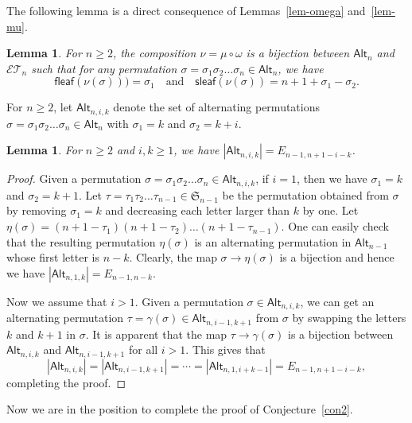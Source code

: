 \documentclass[12pt]{article}
\numberwithin{equation}{section}
\theoremstyle{plain}
\newtheorem{lemma}[theorem]{Lemma}
\def\Alt{\mathsf{Alt}}
\def\fleaf{\mathsf{fleaf}}
\def\sleaf{\mathsf{sleaf}}
\begin{document}
  
  The following lemma is a direct consequence of Lemmas~\ref{lem-omega} and~\ref{lem-mu}. 
  \begin{lemma}\label{lem-comp}
  	For $n\geq 2$, the composition  $\nu=\mu\circ\omega$ is a bijection between $\Alt_n$ and $\mathcal{ET}_n$ such that for any  permutation $\sigma=\sigma_1\sigma_2\ldots \sigma_n\in \Alt_n$, we have
  	\begin{equation}\label{eq-comp}
  		\fleaf(\nu(\sigma)))= \sigma_1 \quad \text{and}\quad \sleaf(\nu(\sigma))=n+1+\sigma_1-\sigma_2.
  	\end{equation}
  \end{lemma}
  
  For $n\geq 2$, 
  let $\Alt_{n, i,k}$ denote the set of alternating permutations $\sigma=\sigma_1\sigma_2\ldots \sigma_n\in \Alt_n$ with $\sigma_1=k$ and $\sigma_2=k+i$.
  
  \begin{lemma}\label{lem-Alt}
  	For $n\geq 2$ and $i, k\geq 1$,  we have $|\Alt_{n,i,k}|=E_{n-1, n+1-i-k}$. 
  \end{lemma}
  \begin{proof}
  	Given a permutation $\sigma=\sigma_1\sigma_2\ldots \sigma_n\in \Alt_{n,i,k}$, if $i=1$,  then we have $\sigma_1=k$ and $\sigma_{2}=k+1$.   Let $\tau=\tau_1\tau_2\ldots \tau_{n-1}\in \mathfrak{S}_{n-1}$ be the permutation obtained from $\sigma$ by removing $\sigma_{1}=k$  and decreasing each letter larger than $k$ by one.   Let $\eta(\sigma)=(n+1-\tau_1)(n+1-\tau_2)\ldots (n+1-\tau_{n-1})$. One can easily check that the resulting permutation $\eta(\sigma)$ is an alternating permutation in $\Alt_{n-1}$ whose first letter is $n-k$. Clearly, the map $\sigma\rightarrow \eta(\sigma)$ is a bijection and hence  we have $|\Alt_{n,1,k}|=E_{n-1, n-k}$. 
  	
  	
  	
  	Now we assume that $i>1$.
  	Given a permutation $\sigma\in \Alt_{n,i,k}$,  we can get an alternating permutation $\tau=\gamma(\sigma)\in \Alt_{n,i-1,k+1}$ from $\sigma$ by swapping the letters $k$ and $k+1$ in $\sigma$.   It is apparent that the map $\tau\rightarrow \gamma(\sigma)$ is a bijection between $\Alt_{n, i,k}$ and $\Alt_{n,i-1, k+1}$ for all $i>1$. This gives that
  	$$
	|\Alt_{n,i,k}|=|\Alt_{n, i-1, k+1}|=\cdots=|\Alt_{n, 1, i+k-1}|=E_{n-1, n+1-i-k},
	$$ 
	 completing the proof. 
  	 \end{proof}
  
  Now we are in the position to complete the proof of Conjecture~\ref{con2}. 
  
\end{document}
